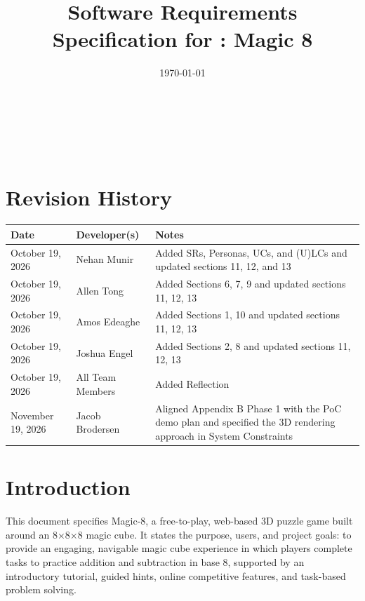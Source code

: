 \documentclass[12pt]{article}
\begin{document}
\title{Software Requirements Specification for \progname: Magic 8} 
\author{\authname}
\date{\today}
	
\maketitle

~\newpage


\tableofcontents

~\newpage

\section*{Revision History}

\begin{tabularx}{\textwidth}{p{3cm}p{3cm}X}
\toprule {\bf Date} & {\bf Developer(s)} & {\bf Notes}\\
\midrule
October 19, 2026 & Nehan Munir & Added SRs, Personas, UCs, and (U)LCs and updated sections 11, 12, and 13\\
October 19, 2026 & Allen Tong & Added Sections 6, 7, 9 and updated sections 11, 12, 13\\
October 19, 2026 & Amos Edeaghe & Added Sections 1, 10 and updated sections 11, 12, 13\\
October 19, 2026 & Joshua Engel & Added Sections 2, 8 and updated sections 11, 12, 13\\
October 19, 2026 & All Team Members & Added Reflection\\
November 19, 2026 & Jacob Brodersen & Aligned Appendix B Phase 1 with the PoC demo plan and specified the 3D rendering approach in System Constraints\\
\bottomrule
\end{tabularx}

\newpage


\section{Introduction} 

This document specifies Magic-8, a free-to-play, web-based 3D puzzle game built around an 8×8×8 magic cube.
It states the purpose, users, and project goals: to provide an engaging, navigable magic cube experience in which players complete tasks to practice addition and subtraction in base 8, supported by an introductory tutorial, guided hints, online competitive features, and task-based problem solving. 
\end{document}
